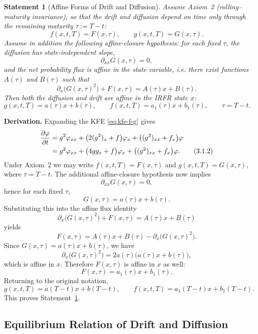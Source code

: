 \documentclass[12pt]{article}
\theoremstyle{statementstyle}
\newtheorem{statement}{Statement}[section]
\begin{document}
\begin{statement}[Affine Forms of Drift and Diffusion]
\label{stmt:affineforms}
\emph{
Assume Axiom~2 (rolling--maturity invariance), so that the drift and
diffusion depend on time only through the remaining maturity
\(\tau:=T-t\):
}
\[
f(x,t,T)=F(x,\tau), \qquad g(x,t,T)=G(x,\tau).
\]
\emph{Assume in addition the following affine-closure hypothesis: for each fixed \(\tau\), the diffusion has state-independent slope,}
\[
\partial_{xx}G(x,\tau)=0,
\]
\emph{
and the net probability flux is affine in the state variable, i.e.
there exist functions \(A(\tau)\) and \(B(\tau)\) such that}
\[
\partial_x\!\bigl(G(x,\tau)^2\bigr)+F(x,\tau)=A(\tau)x+B(\tau).
\]
\emph{
Then both the diffusion and drift are affine in the IRFR state \(x\):
}
\begin{equation}
g(x,t,T)=a(\tau)x+b(\tau),
\qquad
f(x,t,T)=a_1(\tau)x+b_1(\tau),
\qquad \tau=T-t.
\tag{3.1.1}\label{eq:affineforms}
\end{equation}
\end{statement}

\medskip

\noindent\textbf{Derivation.}
Expanding the KFE \eqref{eq:kfe-f-g} gives
\begin{align}
\frac{\partial \varphi}{\partial t}
&=
g^{2}\varphi_{xx}
+\bigl(2(g^{2})_{x}+f\bigr)\varphi_{x}
+\bigl((g^{2})_{xx}+f_{x}\bigr)\varphi
\notag\\
&=
g^{2}\varphi_{xx}
+\bigl(4g g_{x}+f\bigr)\varphi_{x}
+\bigl((g^{2})_{xx}+f_{x}\bigr)\varphi.
\tag{3.1.2}\label{eq:kfe-expanded}
\end{align}
Under Axiom~2 we may write \(f(x,t,T)=F(x,\tau)\) and \(g(x,t,T)=G(x,\tau)\),
where \(\tau=T-t\). The additional affine-closure hypothesis now implies
\[
\partial_{xx}G(x,\tau)=0,
\]
hence for each fixed \(\tau\),
\[
G(x,\tau)=a(\tau)x+b(\tau).
\]
Substituting this into the affine flux identity
\[
\partial_x\!\bigl(G(x,\tau)^2\bigr)+F(x,\tau)=A(\tau)x+B(\tau)
\]
yields
\[
F(x,\tau)
=
A(\tau)x+B(\tau)-\partial_x\!\bigl(G(x,\tau)^2\bigr).
\]
Since \(G(x,\tau)=a(\tau)x+b(\tau)\), we have
\[
\partial_x\!\bigl(G(x,\tau)^2\bigr)
=
2a(\tau)\bigl(a(\tau)x+b(\tau)\bigr),
\]
which is affine in \(x\). Therefore \(F(x,\tau)\) is affine in \(x\) as well:
\[
F(x,\tau)=a_1(\tau)x+b_1(\tau).
\]
Returning to the original notation,
\[
g(x,t,T)=a(T-t)x+b(T-t),
\qquad
f(x,t,T)=a_1(T-t)x+b_1(T-t).
\]
This proves Statement~\ref{stmt:affineforms}.
\subsection{Equilibrium Relation of Drift and Diffusion}
\end{document}
